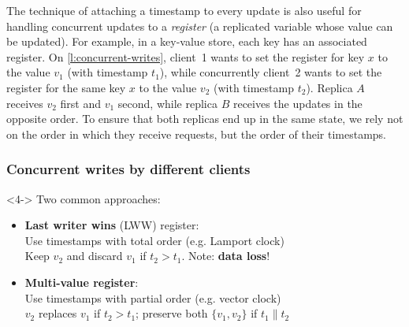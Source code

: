 The technique of attaching a timestamp to every update is also useful for handling concurrent updates to a \emph{register} (a replicated variable whose value can be updated).
For example, in a key-value store, each key has an associated register.
On \autoref{l:concurrent-writes}, client~1 wants to set the register for key $x$ to the value $v_1$ (with timestamp $t_1$), while concurrently client~2 wants to set the register for the same key $x$ to the value $v_2$ (with timestamp $t_2$).
Replica $A$ receives $v_2$ first and $v_1$ second, while replica $B$ receives the updates in the opposite order.
To ensure that both replicas end up in the same state, we rely not on the order in which they receive requests, but the order of their timestamps.

\begin{frame}
    \label{s:concurrent-writes}
    \frametitle{Concurrent writes by different clients}
    \begin{center}
    \end{center}%
    \begin{uncoverenv}<4->
        Two common approaches:
        \begin{itemize}
            \item \textbf{Last writer wins} (LWW) register:\\
                Use timestamps with total order (e.g. Lamport clock)\\
                Keep $v_2$ and discard $v_1$ if $t_2 > t_1$. Note: \textbf{data loss}!
            \item<5-> \textbf{Multi-value register}:\\
                Use timestamps with partial order (e.g. vector clock)\\
                $v_2$ replaces $v_1$ if $t_2 > t_1$; preserve both $\{v_1,v_2\}$ if $t_1 \parallel t_2$\\[1em]
        \end{itemize}
    \end{uncoverenv}
\end{frame}
